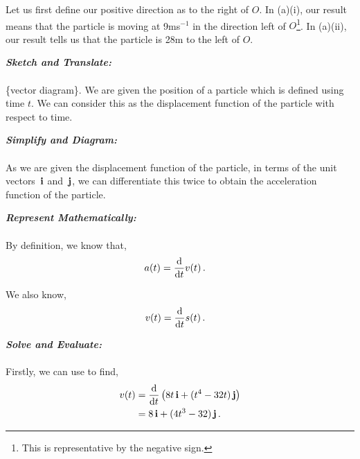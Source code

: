 \begin{subquestions}
\subquestion

Let us first define our positive direction as to the right of $O$. In (a)(i), our result means that the particle is moving at 9ms$^{-1}$ in the direction left of $O$\footnote{This is representative by the negative sign.}. In (a)(ii), our result tells us that the particle is 28m to the left of $O$.


\subquestion

\begin{subsubquestions}
	
\subsubquestion

\textbf{\textit{Sketch and Translate:}} \\ \\
\{vector diagram\}. We are given the position of a particle which is defined using time $t$. We can consider this as the displacement function of the particle with respect to time.




\textbf{\textit{Simplify and Diagram:}} \\ \\
As we are given the displacement function of the particle, in terms of the unit vectors $\,\mathbf{i}$ and $\,\mathbf{j}$, we can differentiate this twice to obtain the acceleration function of the particle.



 
\textbf{\textit{Represent Mathematically:}} \\ \\
By definition, we know that,
\begin{align}
	a(t) & = \frac{\mathrm{d}}{\mathrm{d}t}v(t) \label{2009:q6:AEqn2} \,.
\end{align}

We also know,
\begin{align}
	v(t) & = \frac{\mathrm{d}}{\mathrm{d}t}s(t) \label{2009:q6:VEqn2} \,.
\end{align}



\textbf{\textit{Solve and Evaluate:}} \\ \\
Firstly, we can use  to find,
\begin{align}
	v(t) & = \frac{\mathrm{d}}{\mathrm{d}t}\left(8t\,\mathbf{i} + (t^4-32t)\,\mathbf{j}\right) \nonumber \\
	     & = 8\,\mathbf{i} + (4t^3-32)\,\mathbf{j} \,.
\end{align}


\end{subsubquestions}
\end{subquestions}
